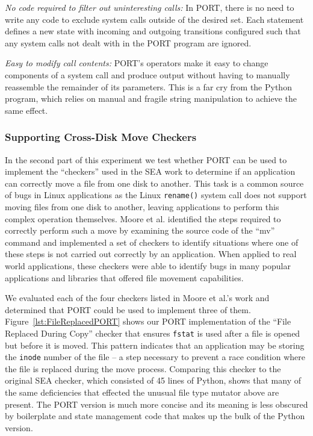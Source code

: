 \textit{No code required to filter out uninteresting calls:}
In PORT, there is no
need to write any code to exclude system
calls outside of the desired set.  Each statement defines a new state with
incoming and outgoing transitions configured such that any system calls not
dealt with in the PORT program are ignored.

\textit{Easy to modify call contents:}  PORT's operators make it
easy to change components of a system call
and produce output without having to manually reassemble the remainder of its
parameters.
This is a far cry
from the Python program, which relies on manual and fragile string manipulation
to achieve the same effect.

\subsubsection{Supporting Cross-Disk Move Checkers}

In the second part of this experiment we test whether PORT can be used to
implement the ``checkers'' used in the SEA work to determine if an
application can correctly move a file from one disk to another.
This task is a common source of bugs in Linux applications as the
Linux
{\tt rename()} system call does not support moving files from one disk to
another, leaving
applications to perform this complex
operation themselves.
Moore et al. identified the steps required to
correctly perform such a move by examining the source code of the ``mv''
command and implemented a set of checkers to identify situations where one
of these steps is not carried out correctly by an application.
When applied to real world applications,
these checkers were able to identify bugs
in many popular applications and libraries that offered file movement
capabilities.

We evaluated each of the four checkers listed in Moore et al.'s work and
determined that PORT could be used to implement three of them.
Figure~\ref{lst:FileReplacedPORT} shows our PORT implementation of
the ``File Replaced During Copy'' checker
that ensures {\tt fstat} is used after a file is opened but
before it is moved.  This pattern indicates that an application may be
storing the {\tt inode} number of the file -- a step necessary to prevent a race
condition where the file is replaced during the move process.
Comparing this checker to the
original SEA checker,
which consisted of 45 lines of Python,
shows that many of the same deficiencies that effected the unusual file type
mutator above are present.
The PORT version is much more concise and its meaning is
less obscured by boilerplate and state management code that makes up the
bulk of the Python version.

